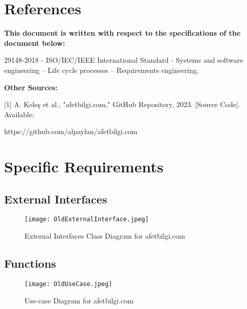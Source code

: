 \documentclass[11pt,a4paper]{article}
\begin{document}
\section{References}
\textbf{This document is written with respect to the specifications of the document below:} 
\vspace{0.2cm}

29148-2018 - ISO/IEC/IEEE International Standard - Systems and software engineering – Life cycle processes – Requirements engineering.

\vspace{0.5cm}
\textbf{Other Sources:}
\vspace{0.2cm}

[1] A. Keleş et al., "afetbilgi.com," GitHub Repository, 2023. [Source Code]. Available: 

https://github.com/alpaylan/afetbilgi.com

\newpage

\section{Specific Requirements}

\subsection{External Interfaces}

\begin{figure}[H]
    \centering
    \texttt{[image: OldExternalInterface.jpeg]}
    \caption{External Interfaces Class Diagram for afetbilgi.com}
    \label{External Interfaces Class Diagram}
\end{figure}

\newpage

\subsection{Functions}
\label{sec:Func}
\begin{figure}[H]
    \centering
    \texttt{[image: OldUseCase.jpeg]}
    \caption{Use-case Diagram for afetbilgi.com}
    \label{Use-case Diagram}
\end{figure}

\newpage

\end{document}
